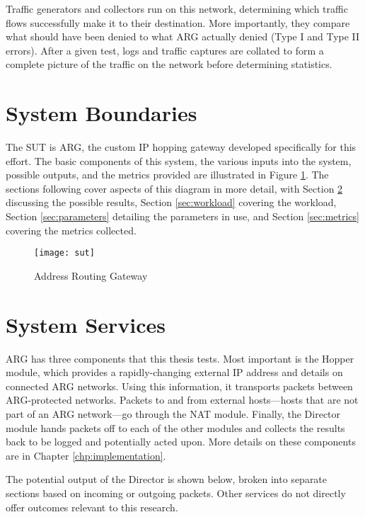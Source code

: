 \par Traffic generators and collectors run on this network, determining which traffic flows successfully make it to their destination. More importantly, they compare what should have been denied to what \ac{ARG} actually denied (Type I and Type II errors). After a given test, logs and traffic captures are collated to form a complete picture of the traffic on the network before determining statistics.

\FloatBarrier
\section{System Boundaries}
\label{sec:boundaries}
\par The \ac{SUT} is \ac{ARG}, the custom \ac{IP} hopping gateway developed specifically for this effort. The basic components of this system, the various inputs into the system, possible outputs, and the metrics provided are illustrated in Figure \ref{fig:sut}. The sections following cover aspects of this diagram in more detail, with Section \ref{sec:services} discussing the possible results, Section \ref{sec:workload} covering the workload, Section \ref{sec:parameters} detailing the parameters in use, and Section \ref{sec:metrics} covering the metrics collected.

\begin{figure}
	\caption{Address Routing Gateway}
	\label{fig:sut}
	\centering
	\texttt{[image: sut]}
\end{figure}

\FloatBarrier
\section{System Services}
\label{sec:services}
\par \ac{ARG} has three components that this thesis tests. Most important is the Hopper module, which provides a rapidly-changing external \ac{IP} address and details on connected ARG networks. Using this information, it transports packets between ARG-protected networks. Packets to and from external hosts---hosts that are not part of an ARG network---go through the \ac{NAT} module. Finally, the Director module hands packets off to each of the other modules and collects the results back to be logged and potentially acted upon. More details on these components are in Chapter \ref{chp:implementation}.

\par The potential output of the Director is shown below, broken into separate sections based on incoming or outgoing packets. Other services do not directly offer outcomes relevant to this research.

